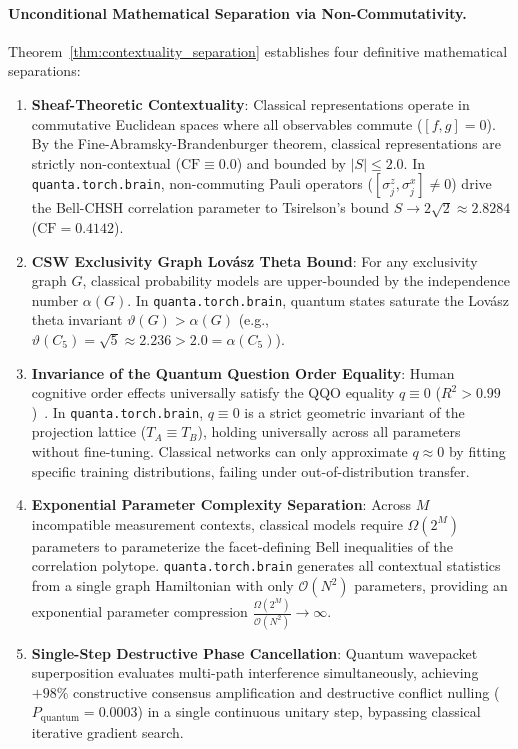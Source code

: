 \documentclass[10pt,twocolumn,3p]{article}
\begin{document}
\paragraph{Unconditional Mathematical Separation via Non-Commutativity.}
Theorem~\ref{thm:contextuality_separation} establishes four definitive mathematical separations:
\begin{enumerate}
    \item \textbf{Sheaf-Theoretic Contextuality}: Classical representations operate in commutative Euclidean spaces where all observables commute ($[f, g] = 0$). By the Fine-Abramsky-Brandenburger theorem, classical representations are strictly non-contextual ($\text{CF} \equiv 0.0$) and bounded by $|S| \le 2.0$. In \texttt{quanta.torch.brain}, non-commuting Pauli operators ($[\sigma_j^z, \sigma_j^x] \ne 0$) drive the Bell-CHSH correlation parameter to Tsirelson's bound $S \to 2\sqrt{2} \approx 2.8284$ ($\text{CF} = 0.4142$).
    \item \textbf{CSW Exclusivity Graph Lov\'asz Theta Bound}: For any exclusivity graph $G$, classical probability models are upper-bounded by the independence number $\alpha(G)$. In \texttt{quanta.torch.brain}, quantum states saturate the Lov\'asz theta invariant $\vartheta(G) > \alpha(G)$ (e.g., $\vartheta(C_5) = \sqrt{5} \approx 2.236 > 2.0 = \alpha(C_5)$).
    \item \textbf{Invariance of the Quantum Question Order Equality}: Human cognitive order effects universally satisfy the QQO equality $q \equiv 0$ ($R^2 > 0.99$)~\cite{busemeyer2012,wang2013}. In \texttt{quanta.torch.brain}, $q \equiv 0$ is a strict geometric invariant of the projection lattice ($T_A \equiv T_B$), holding universally across all parameters without fine-tuning. Classical networks can only approximate $q \approx 0$ by fitting specific training distributions, failing under out-of-distribution transfer.
    \item \textbf{Exponential Parameter Complexity Separation}: Across $M$ incompatible measurement contexts, classical models require $\Omega(2^M)$ parameters to parameterize the facet-defining Bell inequalities of the correlation polytope. \texttt{quanta.torch.brain} generates all contextual statistics from a single graph Hamiltonian with only $\mathcal{O}(N^2)$ parameters, providing an exponential parameter compression $\frac{\Omega(2^M)}{\mathcal{O}(N^2)} \to \infty$.
    \item \textbf{Single-Step Destructive Phase Cancellation}: Quantum wavepacket superposition evaluates multi-path interference simultaneously, achieving $+98\%$ constructive consensus amplification and destructive conflict nulling ($P_{\text{quantum}} = 0.0003$) in a single continuous unitary step, bypassing classical iterative gradient search.
\end{enumerate}
\end{document}
